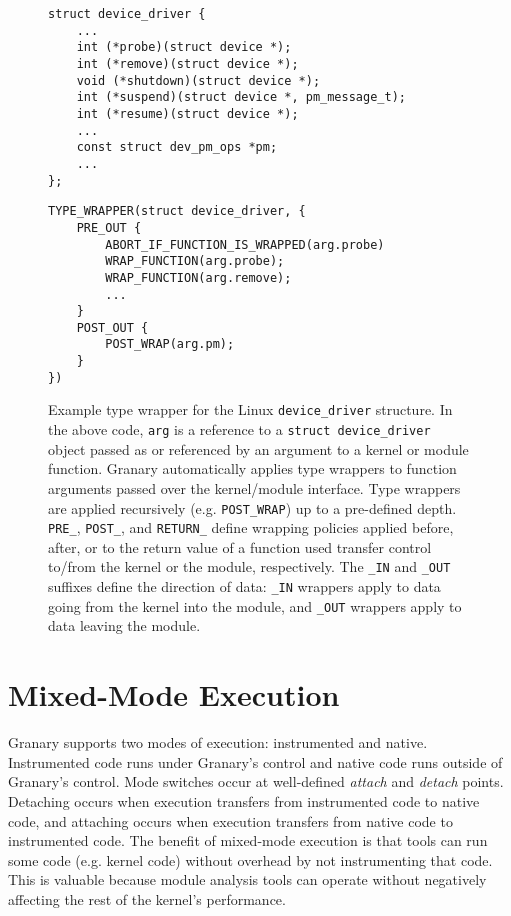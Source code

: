 \documentclass[letterpaper,twocolumn,10pt]{article}
\let\ORIGcaption\caption
\renewcommand{\caption}[2][\compressedcaption]{%
\def\compressedcaption{#2}%
    \vspace{-5pt}%
    \ORIGcaption[#1]{#2}%
    \vspace{-12pt}}
\begin{document}
\begin{figure*}[t!]
\lstset{language=C, tabsize=2, stepnumber=1}
\begin{multicols}{2}
\begin{lstlisting}[basicstyle=\footnotesize\ttfamily]
struct device_driver {
	...
	int (*probe)(struct device *);
	int (*remove)(struct device *);
	void (*shutdown)(struct device *);
	int (*suspend)(struct device *, pm_message_t);
	int (*resume)(struct device *);
	...
	const struct dev_pm_ops *pm;
	...
};
\end{lstlisting}
\columnbreak
\begin{lstlisting}[basicstyle=\footnotesize\ttfamily]
TYPE_WRAPPER(struct device_driver, {
    PRE_OUT {
        ABORT_IF_FUNCTION_IS_WRAPPED(arg.probe)
        WRAP_FUNCTION(arg.probe);
        WRAP_FUNCTION(arg.remove);
        ...
    }
    POST_OUT {
        POST_WRAP(arg.pm);
    }
})
\end{lstlisting}
\end{multicols}
\caption[LoF entry]{Example type wrapper for the Linux \texttt{device\_driver} structure. In the above code, \texttt{arg} is a reference to a \texttt{struct device\_driver} object passed as or referenced by an argument to a kernel or module function. Granary automatically applies type wrappers to function arguments passed over the kernel/module interface. Type wrappers are applied recursively (e.g. \texttt{POST\_WRAP}) up to a pre-defined depth. \texttt{PRE\_}, \texttt{POST\_}, and \texttt{RETURN\_} define wrapping policies applied before, after, or to the return value of a function used transfer control to/from the kernel or the module, respectively. The \texttt{\_IN} and \texttt{\_OUT} suffixes define the direction of data: \texttt{\_IN} wrappers apply to data going from the kernel into the module, and \texttt{\_OUT} wrappers apply to data leaving the module.}
\label{fig:type_wrapper}
\end{figure*}

\section{Mixed-Mode Execution}\label{sec:modes}
Granary supports two modes of execution: instrumented and native. Instrumented code runs under Granary's control and native code runs outside of Granary's control. Mode switches occur at well-defined \emph{attach} and \emph{detach} points. Detaching occurs when execution transfers from instrumented code to native code, and attaching occurs when execution transfers from native code to instrumented code. The benefit of mixed-mode execution is that tools can run some code (e.g. kernel code) without overhead by not instrumenting that code. This is valuable because module analysis tools can operate without negatively affecting the rest of the kernel's performance.
\end{document}
